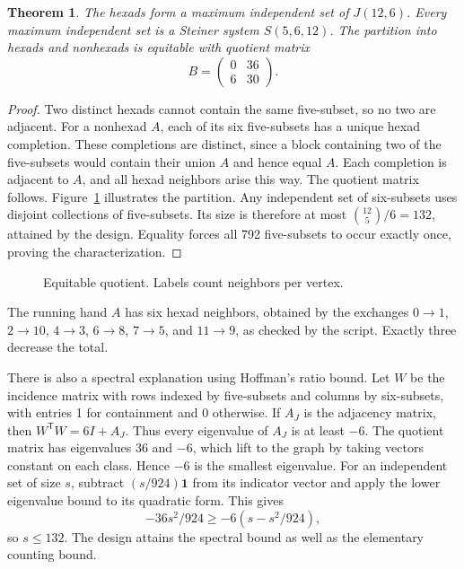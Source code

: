 \documentclass[12pt,letterpaper]{article}
\newtheorem{theorem}{Theorem}[section]
\theoremstyle{definition}\newtheorem{example}[theorem]{Example}
\numberwithin{equation}{section}
\begin{document}
\begin{theorem}\label{thm:equitable}
The hexads form a maximum independent set of $J(12,6)$. Every maximum independent set is a Steiner system $S(5,6,12)$. The partition into hexads and nonhexads is equitable with quotient matrix
\begin{equation}\label{eq:quotient}
B=\begin{pmatrix}0&36\\6&30\end{pmatrix}.
\end{equation}
\end{theorem}

\begin{proof}
Two distinct hexads cannot contain the same five-subset, so no two are adjacent. For a nonhexad $A$, each of its six five-subsets has a unique hexad completion. These completions are distinct, since a block containing two of the five-subsets would contain their union $A$ and hence equal $A$. Each completion is adjacent to $A$, and all hexad neighbors arise this way. The quotient matrix follows. Figure~\ref{fig:quotient} illustrates the partition. Any independent set of six-subsets uses disjoint collections of five-subsets. Its size is therefore at most $\binom{12}{5}/6=132$, attained by the design. Equality forces all 792 five-subsets to occur exactly once, proving the characterization.
\end{proof}

\begin{figure}[ht]
\centering
{}
\caption{Equitable quotient. Labels count neighbors per vertex.}
\label{fig:quotient}
\end{figure}

The running hand $A$ has six hexad neighbors, obtained by the exchanges $0\to1$, $2\to10$, $4\to3$, $6\to8$, $7\to5$, and $11\to9$, as checked by the script. Exactly three decrease the total.

There is also a spectral explanation using Hoffman's ratio bound. Let $W$ be the incidence matrix with rows indexed by five-subsets and columns by six-subsets, with entries 1 for containment and 0 otherwise. If $A_J$ is the adjacency matrix, then $W^\mathsf{T}W=6I+A_J$. Thus every eigenvalue of $A_J$ is at least $-6$. The quotient matrix has eigenvalues 36 and $-6$, which lift to the graph by taking vectors constant on each class. Hence $-6$ is the smallest eigenvalue. For an independent set of size $s$, subtract $(s/924)\mathbf 1$ from its indicator vector and apply the lower eigenvalue bound to its quadratic form. This gives
\[
-36s^2/924\ge -6(s-s^2/924),
\]
so $s\le132$. The design attains the spectral bound as well as the elementary counting bound.
\end{document}
